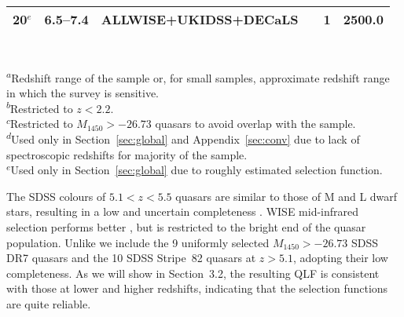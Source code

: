 \documentclass[fleqn,usenatbib]{mnras}
\begin{document}
\begin{table*}
\begin{tabular}{lcllrS}
    20$^e$ & 6.5--7.4 & ALLWISE+UKIDSS+DECaLS & \citet{2018Natur.553..473B} & 1 & 2500.0 \\
    \hline
  \end{tabular}\\
  \begin{minipage}{14.5cm}
    \textsuperscript{$a$}{Redshift range of the sample or, for small
      samples, approximate redshift range in which the survey is
      sensitive.}\\
    \textsuperscript{$b$}{Restricted to $z<2.2$.}\\
    \textsuperscript{$c$}{Restricted to $M_{1450}>-26.73$ quasars to
      avoid overlap with the \citet{2016ApJ...829...33Y} sample.}\\
    \textsuperscript{$d$}{Used only in Section~\ref{sec:global} and
      Appendix~\ref{sec:conv} due to lack of spectroscopic redshifts
      for majority of the sample.}\\
    \textsuperscript{$e$}{Used only in Section~\ref{sec:global} due to
      roughly estimated selection function.}
 \end{minipage}
\end{table*}

The SDSS colours of $5.1<z<5.5$ quasars are similar to those of M and
L dwarf stars, resulting in a low and uncertain completeness
\citep{2013ApJ...768..105M}. WISE mid-infrared selection performs
better \citep{2016ApJ...829...33Y}, but is restricted to the bright
end of the quasar population. Unlike \citet{2013ApJ...768..105M} we
include the 9 uniformly selected $M_{1450}>-26.73$ SDSS DR7 quasars
and the 10 SDSS Stripe~82 quasars at $z>5.1$, adopting their low
completeness. As we will show in Section~3.2, the resulting
QLF is consistent with those at lower and higher redshifts, indicating
that the \citet{2013ApJ...768..105M} selection functions are quite
reliable.
\end{document}
